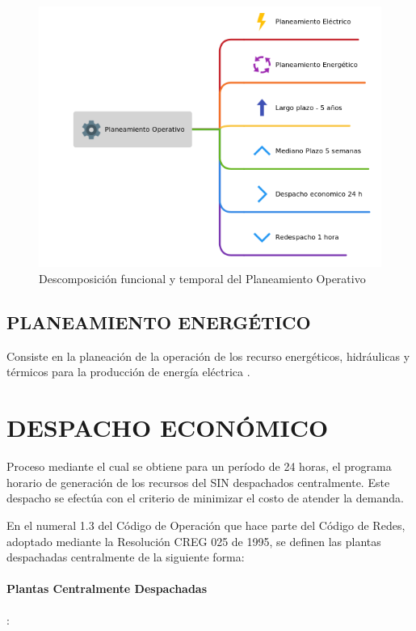 \documentclass[a5paper]{book}%
\begin{document}
\begin{figure}[H]
	\centering
	\caption{Descomposición funcional y temporal del Planeamiento
		Operativo}
	\label{fig:planeamineto-operativo}
	\includegraphics[width=1\linewidth]{planeamineto-operativo}
\end{figure}

\subsection{PLANEAMIENTO ENERGÉTICO}

Consiste en la planeación de la operación de los recurso energéticos,
hidráulicas y térmicos para la producción de energía eléctrica
\cite{CREG0251995}.

\section{DESPACHO ECONÓMICO}
Proceso mediante el cual se obtiene para un período de 24 horas, el programa horario de generación de los recursos del SIN despachados centralmente. Este despacho se efectúa con el criterio de minimizar el costo de atender la demanda.

En el numeral 1.3 del Código de Operación que hace parte del Código de Redes, adoptado mediante la Resolución CREG 025 de 1995, se definen las plantas despachadas centralmente de la siguiente forma:

\paragraph{Plantas Centralmente Despachadas}:
\end{document}
